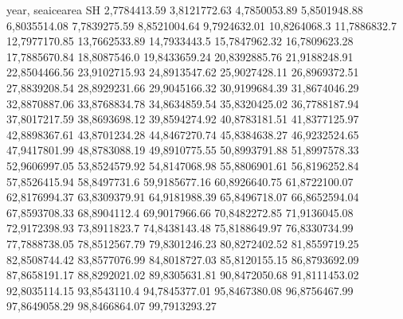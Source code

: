year,    seaicearea SH
2,7784413.59
3,8121772.63
4,7850053.89
5,8501948.88
6,8035514.08
7,7839275.59
8,8521004.64
9,7924632.01
10,8264068.3
11,7886832.7
12,7977170.85
13,7662533.89
14,7933443.5
15,7847962.32
16,7809623.28
17,7885670.84
18,8087546.0
19,8433659.24
20,8392885.76
21,9188248.91
22,8504466.56
23,9102715.93
24,8913547.62
25,9027428.11
26,8969372.51
27,8839208.54
28,8929231.66
29,9045166.32
30,9199684.39
31,8674046.29
32,8870887.06
33,8768834.78
34,8634859.54
35,8320425.02
36,7788187.94
37,8017217.59
38,8693698.12
39,8594274.92
40,8783181.51
41,8377125.97
42,8898367.61
43,8701234.28
44,8467270.74
45,8384638.27
46,9232524.65
47,9417801.99
48,8783088.19
49,8910775.55
50,8993791.88
51,8997578.33
52,9606997.05
53,8524579.92
54,8147068.98
55,8806901.61
56,8196252.84
57,8526415.94
58,8497731.6
59,9185677.16
60,8926640.75
61,8722100.07
62,8176994.37
63,8309379.91
64,9181988.39
65,8496718.07
66,8652594.04
67,8593708.33
68,8904112.4
69,9017966.66
70,8482272.85
71,9136045.08
72,9172398.93
73,8911823.7
74,8438143.48
75,8188649.97
76,8330734.99
77,7888738.05
78,8512567.79
79,8301246.23
80,8272402.52
81,8559719.25
82,8508744.42
83,8577076.99
84,8018727.03
85,8120155.15
86,8793692.09
87,8658191.17
88,8292021.02
89,8305631.81
90,8472050.68
91,8111453.02
92,8035114.15
93,8543110.4
94,7845377.01
95,8467380.08
96,8756467.99
97,8649058.29
98,8466864.07
99,7913293.27
